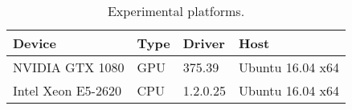 \begin{table}[t!]
  \scriptsize %
  \centering %
    \begin{tabular}{l l l l}
      \toprule
      \textbf{Device} & \textbf{Type} & \textbf{Driver} & \textbf{Host} \\
      \midrule
      NVIDIA GTX 1080 & GPU & 375.39 & Ubuntu 16.04 x64\\
      Intel Xeon E5-2620 & CPU & 1.2.0.25 & Ubuntu 16.04 x64\\
    \end{tabular}
    \label{tab:cgo-platforms}
  \caption{Experimental platforms.}
  \label{tab:platforms}
\end{table}
